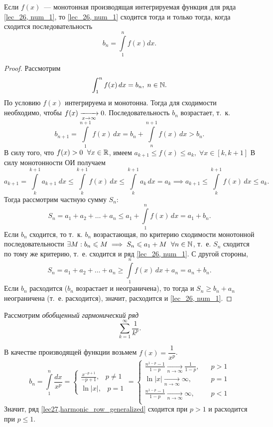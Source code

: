 \documentclass[../../main.tex]{subfiles}
\begin{document}
	\begin{thm} \label{lec27,integral_att}
		Если $f(x)$~--- монотонная производящая интегрируемая функция для ряда 
		\eqref{lec_26, num_1}, то \eqref{lec_26, num_1} сходится тогда и только 
		тогда, когда сходится последовательность \[b_n = \int\limits_1^n f(x)dx.\]
		\begin{proof}
			Рассмотрим
			\[ \int_{1}^{n} f(x) \, dx = b_n , \; n \in \mathbb{N}.  \]
			По условию $f(x)$ интегрируема и монотонна. Тогда для сходимости 
			необходимо, чтобы $f(x) \xrightarrow[x\to\infty]{}0$.
			Последовательность $b_n$ возрастает, т.~к.
			\[ b_{n+1} = \int\limits_{1}^{n+1} f(x) \, dx  = b_n + 
			\int\limits_{n}^{n+1} f(x) \, dx > 
			b_n. \]
			В силу того, что $f(x) > 0 \ \; \forall x \in \mathbb{R}$,
			имеем $a_{k+1} \le f(x) \le a_k, \; \forall x \in [k,k+1]$
			В силу монотонности ОИ получаем
			\[ a_{k+1} = \int\limits_{k}^{k+1}a_{k+1} \; dx  \le 
			\int\limits_{k}^{k+1}f(x) \, dx \le 
			\int\limits_{k}^{k+1}a_{k} \, dx  = a_{k} \implies a_{k+1} \le 
			\int\limits_{k}^{k+1}f(x) \, dx \le a_k. \]
			Тогда рассмотрим частную сумму $S_n$:
			\[ S_n = a_1 + a_2 + \dots + a_n \le a_1 +  \int\limits_{1}^{n}f(x) \, dx  
			= a_1 + 
			b_n. \]
			Если $b_n$ сходится, то т.~к. $b_n$ возрастающая, по критерию сходимости 
			монотонной последовательности $\exists M : b_n \leqslant M \implies S_n \leqslant a_1 + 
			M \ \; 
			\forall n \in \mathbb{N}$, т.~е. $S_n$ сходится по тому же критерию, т.~е. сходится 
			и ряд \eqref{lec_26, num_1}. С другой стороны,
			\[ S_n = a_1 + a_2 + \dots + a_n \ge \int\limits_{1}^{n}f(x) \, dx  + a_n = 
			a_n + b_n. \]
			Если $b_n$ расходится ($b_n$ возрастает и неограничена), то тогда и $S_n 
			\ge 
			b_n + a_n$ неограничена (т.~е. расходится), значит, расходится и 
			\eqref{lec_26, num_1}.
		\end{proof}
	\end{thm}

	\begin{iex} Рассмотрим \emph{обобщенный гармонический ряд}
		\begin{equation}  \sum_{k = 1}^{\infty} \frac{1}{k^p}. 
		\label{lec27,harmonic_row_generalized}  \end{equation}
		
		В качестве производящей функции возьмем $f(x) = \dfrac{1}{x^p}$.
		\[ b_n = \int\limits_{1}^{n} \frac{dx}{x^p} = \begin{cases} \frac{x^{-p + 
		1}}{-p + 
		1} , \; \;\; p \ne 1  \\  \ln{|x|}, \; \; \; p = 1 \end{cases} =  
		\begin{cases} \frac{n^{1-p} - 1}{1-p } \underset{n \rightarrow \infty}
		{\longrightarrow} \frac{1}{1-p} ,& \; \;\; p > 1  \\  \ln{|x|} \underset{n 
		\rightarrow \infty}
		{\longrightarrow} \infty ,& \; \; \; p = 1 \\
		\frac{n^{1-p} - 1}{1-p } \underset{n \rightarrow \infty}
		{\longrightarrow} \infty ,& \; \;\; p < 1  \\
		\end{cases} \]
		Значит, ряд \eqref{lec27,harmonic_row_generalized} 
		сходится при $p>1$ и расходится при $p \le 1$.
		\end{iex}
		
\end{document}
